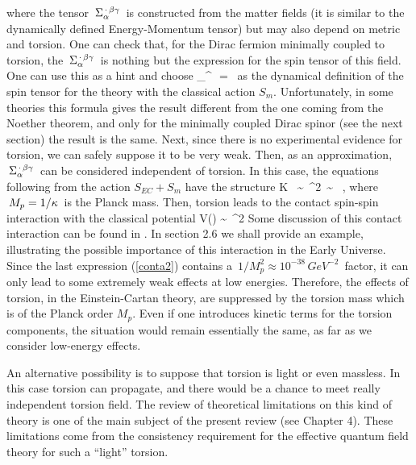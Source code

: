 \label{spinor-source}
\eeq
where the tensor $\,\Sigma_\alpha^{\,\cdot\,\beta\gamma}\,$ is constructed 
from the matter fields (it is similar to 
the dynamically defined Energy-Momentum tensor) but may also depend 
on metric and torsion. One can check that, for the Dirac fermion 
minimally coupled to torsion, the $\,\Sigma_\alpha^{\,\cdot\,\beta\gamma}\,$ 
is nothing but the expression for the spin tensor of this field. 
One can use this as a hint and choose
\beq
\Sigma_\al^{\,\cdot\,\be\ga} = 
\,
\label{spindefin}
\eeq
as the dynamical definition of the 
spin tensor for the theory with the classical action $S_m$. 
Unfortunately, in some theories this formula gives the result 
different from the one coming from the Noether theorem, and 
only for the minimally coupled Dirac spinor (see the next section)
the result is the same. Next, since there is no experimental 
evidence for torsion, we can safely suppose it to be very weak.
Then, as an approximation, $\,\Sigma_\alpha^{\,\cdot\,\beta\gamma}\,$ 
can be considered independent of torsion. 
In this case, the equations following from the 
action $S_{EC}+S_m$ have the structure 
\beq
K \, \sim \, \ka^2 \Sigma \,\sim\, 
 \,\cdot \Sigma\,, 
\label{conta1}
\eeq
where $\,M_p=1/\kappa\,$ is the Planck mass.
Then, torsion leads to the contact spin-spin interaction 
with the classical potential 
\beq
V(\Sigma) \sim  {} \,\cdot \Sigma^2 
\label{conta2}
\eeq
Some discussion of this contact interaction can be found in 
\cite{hehl}. In section 2.6 we shall provide an example, 
illustrating the
possible importance of this interaction in the Early Universe.
Since the last expression  (\ref{conta2}) contains 
a $\,{1}/{M_p^2}\approx 10^{-38}\,GeV^{-2}\,$ factor, it can only
lead to some extremely weak effects at low energies. Therefore,
the effects of torsion, in the Einstein-Cartan theory, are 
suppressed by the torsion mass which is of the Planck order 
$M_p$. Even if one introduces kinetic terms for the
torsion components, the situation would remain essentially 
the same, as far as we consider low-energy effects. 

An alternative possibility is to suppose that  
torsion is light or even massless. In this case torsion can 
propagate, and there would be a chance to meet really independent 
torsion field. The review of theoretical limitations on this 
kind of theory \cite{betor,guhesh}
is one of the main subject of the present review
(see Chapter 4). These limitations 
come from the consistency requirement for the effective 
quantum field theory for such a ``light'' torsion.


